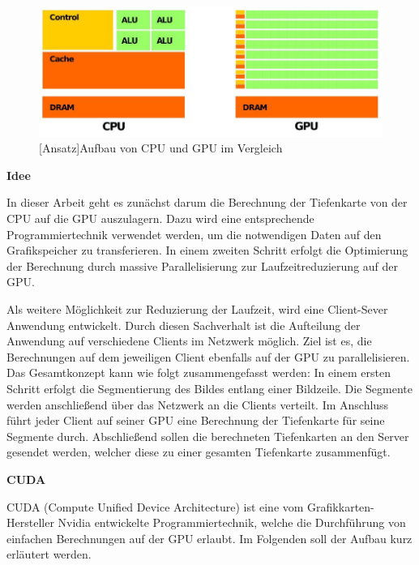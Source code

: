 \documentclass[times, 10pt,twocolumn]{article}
\begin{document}
 \begin{figure}[!ht]
	\centering
	\includegraphics[width=0.9\linewidth]{image/cuda.jpg}
	[Ansatz]{Aufbau von CPU und GPU im Vergleich \cite{CUDA.2015}}
	\label{fig:gpu}
\end{figure}

\textbf{Idee}

In dieser Arbeit geht es zunächst darum die Berechnung der Tiefenkarte von der CPU auf die GPU auszulagern. Dazu wird eine entsprechende Programmiertechnik verwendet werden, um die notwendigen Daten auf den Grafikspeicher zu transferieren. In einem zweiten Schritt erfolgt die Optimierung der Berechnung durch massive Parallelisierung zur Laufzeitreduzierung auf der GPU. 

Als weitere Möglichkeit zur Reduzierung der Laufzeit, wird eine Client-Sever Anwendung entwickelt. Durch diesen Sachverhalt ist die Aufteilung der Anwendung auf verschiedene Clients im Netzwerk möglich. Ziel ist es, die Berechnungen auf dem jeweiligen Client ebenfalls auf der GPU zu parallelisieren. Das Gesamtkonzept kann wie folgt zusammengefasst werden: In einem ersten Schritt erfolgt die Segmentierung des Bildes entlang einer Bildzeile. Die Segmente werden anschließend über das Netzwerk an die Clients verteilt. Im Anschluss führt jeder Client auf seiner GPU eine Berechnung der Tiefenkarte für seine Segmente durch. Abschließend sollen die berechneten Tiefenkarten an den Server gesendet werden, welcher diese zu einer gesamten Tiefenkarte zusammenfügt. 

\textbf{CUDA}

CUDA (Compute Unified Device Architecture) ist eine vom Grafikkarten-Hersteller Nvidia entwickelte Programmiertechnik, welche die Durchführung von einfachen Berechnungen auf der GPU erlaubt. Im Folgenden soll der Aufbau kurz erläutert werden.
  
\end{document}
